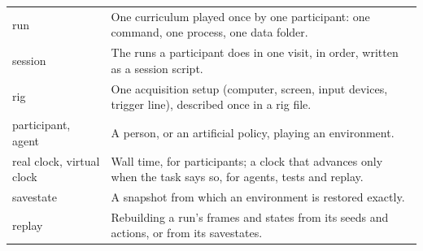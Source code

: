 \begin{table}[t]
\begin{tabularx}{\textwidth}{@{}l>{\raggedright\arraybackslash}X@{}}
    run & One curriculum played once by one participant: one command, one process, one data folder. \\
    session & The runs a participant does in one visit, in order, written as a session script. \\
    rig & One acquisition setup (computer, screen, input devices, trigger line), described once in a rig file. \\
    participant, agent & A person, or an artificial policy, playing an environment. \\
    real clock, virtual clock & Wall time, for participants; a clock that advances only when the task says so, for agents, tests and replay. \\
    savestate & A snapshot from which an environment is restored exactly. \\
    replay & Rebuilding a run's frames and states from its seeds and actions, or from its savestates. \\
    \bottomrule
  \end{tabularx}
\end{table}

